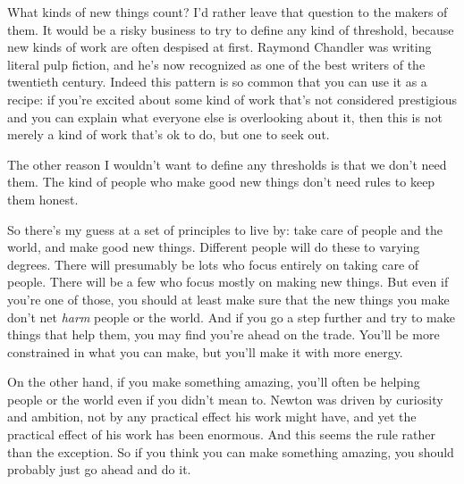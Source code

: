 What
                  kinds of new things count? I'd rather leave that question to
                  the makers of them. It would be a risky business to try to
                  define any kind of threshold, because new kinds of work are
                  often despised at first. Raymond Chandler was writing literal
                  pulp fiction, and he's now recognized as one of the best
                  writers of the twentieth century. Indeed this pattern is so
                  common that you can use it as a recipe: if you're excited
                  about some kind of work that's not considered prestigious and
                  you can explain what everyone else is overlooking about it,
                  then this is not merely a kind of work that's ok to do, but
                  one to seek out.

The other reason I wouldn't want
                  to define any thresholds is that we don't need them. The kind
                  of people who make good new things don't need rules to keep
                  them honest.

So there's my guess at a set of
                  principles to live by: take care of people and the world, and
                  make good new things. Different people will do these to
                  varying degrees. There will presumably be lots who focus
                  entirely on taking care of people. There will be a few who
                  focus mostly on making new things. But even if you're one of
                  those, you should at least make sure that the new things you
                  make don't net \emph{harm} people or the world. And if you go
                  a step further and try to make things that help them, you may
                  find you're ahead on the trade. You'll be more constrained in
                  what you can make, but you'll make it with more energy.

On
                  the other hand, if you make something amazing, you'll often be
                  helping people or the world even if you didn't mean to. Newton
                  was driven by curiosity and ambition, not by any practical
                  effect his work might have, and yet the practical effect of
                  his work has been enormous. And this seems the rule rather
                  than the exception. So if you think you can make something
                  amazing, you should probably just go ahead and do it.











